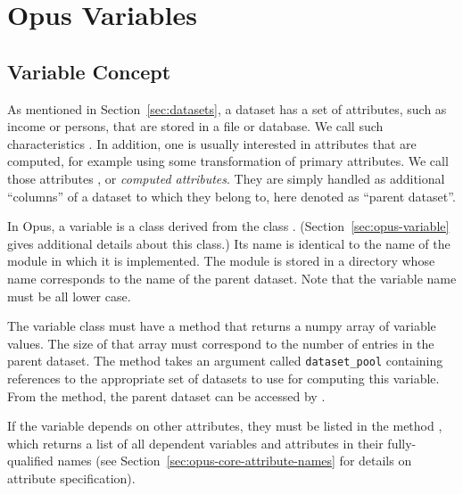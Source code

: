 %
\section{Opus Variables} 
%
\label{sec:variables}
%
\subsection{Variable Concept}
%
\label{sec:variableconcept}
%
\variablesindex

As mentioned in Section~\ref{sec:datasets}, a dataset \datasetindex has a set of
attributes, \attributesindex such as income or persons, that are stored in a file or database.
We call such characteristics . \primaryattributesindex In addition, one is usually
interested in attributes \attributesindex that are computed, for example using some
transformation of primary attributes. \primaryattributesindex We call those attributes , \variablesindex or {\it computed attributes}. \computedattributesindex They are simply handled as additional
``columns'' of a dataset \datasetindex to which they belong to, here denoted as
``parent dataset''. \datasetindex

In Opus, a variable \variablesindex is a class derived from the
 class  \variablesindex.
(Section~\ref{sec:opus-variable} gives additional details about this class.)
Its name is identical to the name of the module in which it is implemented.
The module is stored in a directory whose name corresponds to the name of
the parent dataset. \datasetindex Note that the variable \variablesindex 
name must be all lower case.

The variable \variablesindex class must have a method  
that returns a numpy array of
variable \variablesindex values. The size of that array must correspond to the number of entries in the parent
dataset. \datasetindex The  method takes an argument called
\verb|dataset_pool| containing references to the appropriate set of datasets to
use for computing this variable. From the  method, the parent dataset \datasetindex can be
accessed  by .

If the variable depends on other attributes, they must be listed in the method
, which returns a list of all dependent variables and
attributes in their fully-qualified names (see
Section~\ref{sec:opus-core-attribute-names} for details on attribute
specification).

